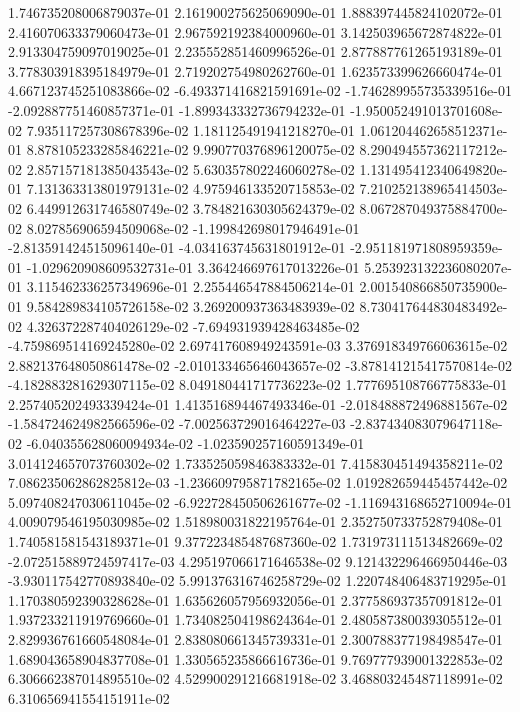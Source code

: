 1.746735208006879037e-01
2.161900275625069090e-01
1.888397445824102072e-01
2.416070633379060473e-01
2.967592192384000960e-01
3.142503965672874822e-01
2.913304759097019025e-01
2.235552851460996526e-01
2.877887761265193189e-01
3.778303918395184979e-01
2.719202754980262760e-01
1.623573399626660474e-01
4.667123745251083866e-02
-6.493371416821591691e-02
-1.746289955735339516e-01
-2.092887751460857371e-01
-1.899343332736794232e-01
-1.950052491013701608e-02
7.935117257308678396e-02
1.181125491941218270e-01
1.061204462658512371e-01
8.878105233285846221e-02
9.990770376896120075e-02
8.290494557362117212e-02
2.857157181385043543e-02
5.630357802246060278e-02
1.131495412340649820e-01
7.131363313801979131e-02
4.975946133520715853e-02
7.210252138965414503e-02
6.449912631746580749e-02
3.784821630305624379e-02
8.067287049375884700e-02
8.027856906594509068e-02
-1.199842698017946491e-01
-2.813591424515096140e-01
-4.034163745631801912e-01
-2.951181971808959359e-01
-1.029620908609532731e-01
3.364246697617013226e-01
5.253923132236080207e-01
3.115462336257349696e-01
2.255446547884506214e-01
2.001540866850735900e-01
9.584289834105726158e-02
3.269200937363483939e-02
8.730417644830483492e-02
4.326372287404026129e-02
-7.694931939428463485e-02
-4.759869514169245280e-02
2.697417608949243591e-03
3.376918349766063615e-02
2.882137648050861478e-02
-2.010133465646043657e-02
-3.878141215417570814e-02
-4.182883281629307115e-02
8.049180441717736223e-02
1.777695108766775833e-01
2.257405202493339424e-01
1.413516894467493346e-01
-2.018488872496881567e-02
-1.584724624982566596e-02
-7.002563729016464227e-03
-2.837434083079647118e-02
-6.040355628060094934e-02
-1.023590257160591349e-01
3.014124657073760302e-02
1.733525059846383332e-01
7.415830451494358211e-02
7.086235062862825812e-03
-1.236609795871782165e-02
1.019282659445457442e-02
5.097408247030611045e-02
-6.922728450506261677e-02
-1.116943168652710094e-01
4.009079546195030985e-02
1.518980031822195764e-01
2.352750733752879408e-01
1.740581581543189371e-01
9.377223485487687360e-02
1.731973111513482669e-02
-2.072515889724597417e-03
4.295197066171646538e-02
9.121432296466950446e-03
-3.930117542770893840e-02
5.991376316746258729e-02
1.220748406483719295e-01
1.170380592390328628e-01
1.635626057956932056e-01
2.377586937357091812e-01
1.937233211919769660e-01
1.734082504198624364e-01
2.480587380039305512e-01
2.829936761660548084e-01
2.838080661345739331e-01
2.300788377198498547e-01
1.689043658904837708e-01
1.330565235866616736e-01
9.769777939001322853e-02
6.306662387014895510e-02
4.529900291216681918e-02
3.468803245487118991e-02
6.310656941554151911e-02
